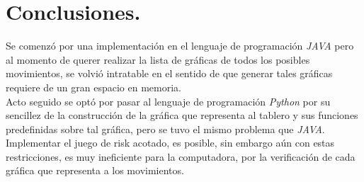 \documentclass[12pt]{article}
\begin{document}
\section{Conclusiones.}
Se comenz\'o por una implementaci\'on en el lenguaje de programaci\'on \textit{JAVA} pero al momento de querer
realizar la lista de gr\'aficas de todos los posibles movimientos, se volvi\'o intratable en el sentido de que
generar tales gr\'aficas requiere de un gran espacio en memoria.\\
Acto seguido se opt\'o por pasar al lenguaje de programaci\'on \textit{Python} por su sencillez de la construcci\'on
de la gr\'afica que representa al tablero y sus funciones predefinidas sobre tal gr\'afica, pero  se tuvo el mismo
problema que \textit{JAVA}.\\
Implementar el juego de risk acotado, es posible, sin embargo a\'un con estas restricciones, es muy ineficiente para la
computadora, por la verificaci\'on de cada gr\'afica que representa a los movimientos.\\


\newpage

	
\nocite{*}
{}
\end{document}
